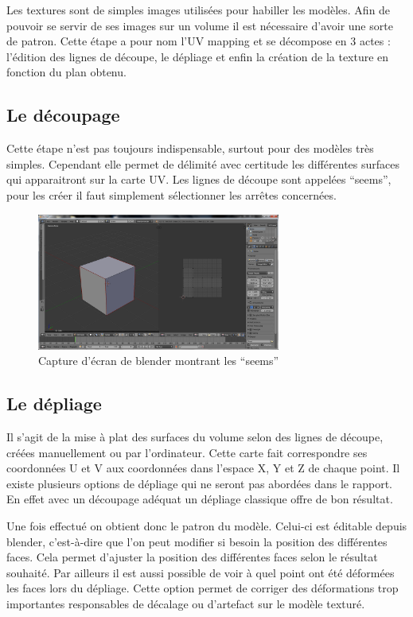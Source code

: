 \documentclass[11pt]{report}
\begin{document}
Les textures sont de simples images utilisées pour habiller les modèles. Afin de pouvoir se servir de ses images sur un volume il est nécessaire d’avoir une sorte de patron. Cette étape a pour nom l’UV mapping et se décompose en 3 actes : l’édition des lignes de découpe, le dépliage et enfin la création de la texture en fonction du plan obtenu.

\subsection{Le découpage}

Cette étape n’est pas toujours indispensable, surtout pour des modèles très simples. Cependant elle permet de délimité avec certitude les différentes surfaces qui apparaitront sur la carte UV. Les lignes de découpe sont appelées ``seems'', pour les créer il faut simplement sélectionner les arrêtes  concernées. 

\begin{figure}[htbp]
\centering
\includegraphics[width=8cm]{seems.png}
\caption{Capture d'écran de blender montrant les ``seems''}
\end{figure}

\subsection{Le dépliage}

Il s’agit de la mise à plat des surfaces du volume selon des lignes de découpe, créées manuellement ou par l’ordinateur. Cette carte fait correspondre ses coordonnées U et V aux coordonnées dans l’espace X, Y et Z de chaque point. Il existe plusieurs options de dépliage qui ne seront pas abordées dans le rapport. En effet avec un découpage adéquat un dépliage classique offre de bon résultat. 

Une fois effectué on obtient donc le patron du modèle. Celui-ci est éditable depuis blender, c’est-à-dire que l’on peut modifier si besoin la position des différentes faces. Cela permet d’ajuster la position des différentes faces selon le résultat souhaité. Par ailleurs il est aussi possible de voir à quel point ont été déformées les faces lors du dépliage. Cette option permet de corriger des déformations trop importantes responsables de décalage ou d’artefact sur le modèle texturé.
\end{document}
